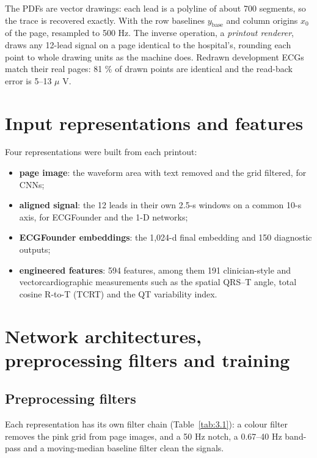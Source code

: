 The PDFs are vector drawings: each lead is a polyline of about 700 segments, so the trace is recovered exactly. With the row baselines $y_{\text{base}}$ and column origins $ x_{0}$ of the page,
\EqThreeOne
resampled to 500 Hz. The inverse operation, a \emph{printout renderer}, draws any 12-lead signal on a page identical to the hospital's, rounding each point to whole drawing units as the machine does. Redrawn development ECGs match their real pages: 81 \% of drawn points are identical and the read-back error is 5--13 $\mu$ V.

\section{Input representations and features}\label{sec:3.4}

Four representations were built from each printout:

\begin{itemize}
  \item \textbf{page image}: the waveform area with text removed and the grid filtered, for CNNs;
  \item \textbf{aligned signal}: the 12 leads in their own 2.5-s windows on a common 10-s axis, for ECGFounder and the 1-D networks;
  \item \textbf{ECGFounder embeddings}: the 1,024-d final embedding and 150 diagnostic outputs;
  \item \textbf{engineered features}: 594 features, among them 191 clinician-style and vectorcardiographic measurements such as the spatial QRS--T angle, total cosine R-to-T (TCRT) and the QT variability index.
\end{itemize}
\section{Network architectures, preprocessing filters and training}\label{sec:3.5}

\subsection{Preprocessing filters}\label{sec:3.5.1}



Each representation has its own filter chain (Table~\ref{tab:3.1}): a colour filter removes the pink grid from page images, and a 50 Hz notch, a 0.67--40 Hz band-pass and a moving-median baseline filter clean the signals.

